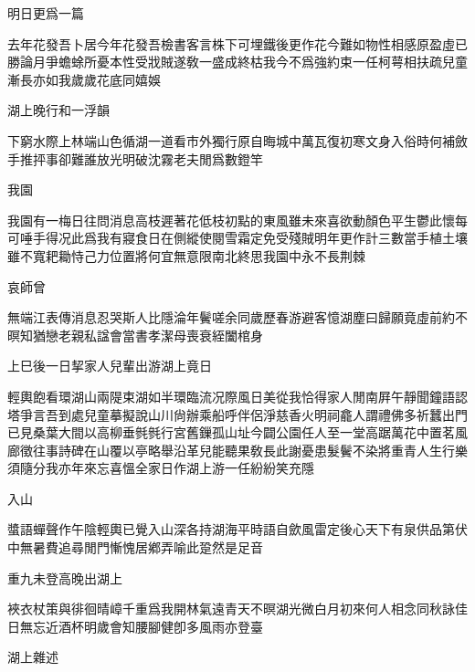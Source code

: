 \documentclass{zhvt-classic-Miya}
\begin{document}
\begin{fw}明日更爲一篇\end{fw}

去年花發吾卜居今年花發吾檢書客言株下可埋鐵後更作花今難如物性相感原盈虛已勝論月爭蟾蜍所憂本性受戕賊遂敎一盛成終枯我今不爲強約束一任柯萼相扶疏兒童漸長亦如我歲歲花底同嬉娛

\begin{fw}湖上晚行和一浮韻\end{fw}

下窮水際上林端山色循湖一道看市外獨行原自晦城中萬瓦復初寒文身入俗時何補斂手推抨事卻難誰放光明破沈霧老夫閒爲數鐙竿

\begin{fw}我園\end{fw}

我園有一梅日往問消息高枝遲著花低枝初點的東風雖未來喜欲動顏色平生鬱此懷每可唾手得况此爲我有寢食日在側縱使閱雪霜定免受殘賊明年更作計三數當手植土壤雖不寬耙耡恃己力位置將何宜無意限南北終思我園中永不長荆棘

\begin{fw}哀師曾\end{fw}

無端江表傳消息忍哭斯人比隱淪年鬢嗟余同歲歷春游避客憶湖塵曰歸願竟虛前約不暝知猶戀老親私諡會當書孝潔母喪衰絰闔棺身

\begin{fw}上巳後一日挈家人兒輩出游湖上竟日\end{fw}

輕輿飽看環湖山兩隄束湖如半環臨流况際風日美從我恰得家人閒南屛午靜聞鐘語認塔爭言吾到處兒童摹擬說山川尙辦乘船呼伴侶淨慈香火明祠龕人謂禮佛多祈蠶出門已見桑葉大間以高柳垂毿毿行宮舊鏁孤山址今闢公園任人至一堂高踞萬花中置茗風廊徵往事詩碑在山覆以亭略舉沿革兒能聽果敎長此謝憂患髮鬢不染將重青人生行樂須隨分我亦年來忘喜慍全家日作湖上游一任紛紛笑充隱

\begin{fw}入山\end{fw}

螿語蟬聲作午陰輕輿已覺入山深各持湖海平時語自歛風雷定後心天下有泉供品第伏中無暑費追尋閒門慚愧居鄕弄喻此跫然是足音

\begin{fw}重九未登高晚出湖上\end{fw}

裌衣杖策與徘徊晴嶂千重爲我開林氣遠青天不暝湖光微白月初來何人相念同秋詠佳日無忘近酒杯明歲會知腰腳健卽多風雨亦登臺

\begin{fw}湖上雜述\end{fw}
\end{document}
